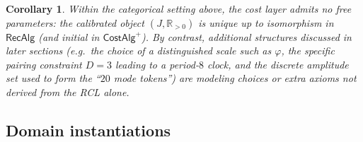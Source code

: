\documentclass[11pt,reqno]{amsart}
\theoremstyle{plain}
\newtheorem{corollary}[theorem]{Corollary}
\theoremstyle{definition}
\theoremstyle{remark}
\newcommand{\phig}{\varphi}
\newcommand{\Jcost}{J}
\newcommand{\RR}{\mathbb{R}}
\newcommand{\1}{\mathbf{1}}
\newcommand{\paperadd}[1]{{\color{paperblue}#1}}
\begin{document}
\begin{corollary}\label{cor:zero-params}
Within the categorical setting above, the \emph{cost layer} admits no free
parameters: the calibrated object $(\Jcost,\RR_{>0})$ is unique up to
isomorphism in $\mathsf{RecAlg}$ (and initial in $\mathsf{CostAlg}^{+}$).
By contrast, additional structures discussed in later sections
(e.g.\ the choice of a distinguished scale such as $\phig$,
the specific pairing constraint $D=3$ leading to a period-$8$ clock,
and the discrete amplitude set used to form the ``$20$ mode tokens'')
are \emph{modeling choices or extra axioms} not derived from the RCL alone.
\end{corollary} %

\subsection{\texorpdfstring{\paperadd{Domain instantiations}}{Domain instantiations}}\label{sec:domains}
\end{document}
